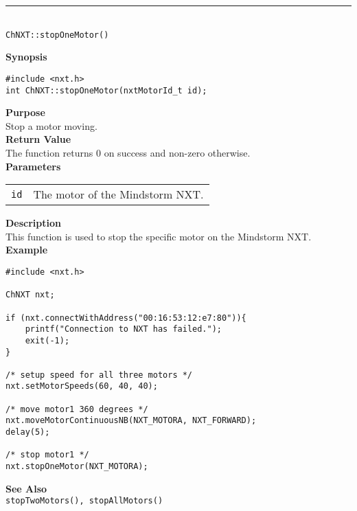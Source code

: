 \noindent
\vspace{5pt}
\rule{4.5in}{0.015in}\\
\noindent
{\LARGE \texttt{ChNXT::stopOneMotor()} }\\


\noindent
{\bf Synopsis}
\begin{lstlisting}
#include <nxt.h>
int ChNXT::stopOneMotor(nxtMotorId_t id);
\end{lstlisting}

\noindent
{\bf Purpose}\\
Stop a motor moving.\\

\noindent
{\bf Return Value}\\
The function returns 0 on success and non-zero otherwise.\\

\noindent
{\bf Parameters}\\
\vspace{-0.1in}
\begin{description}
\item
\begin{tabular}{ p{20mm}p{135mm} }
\texttt{id}       &The motor of the Mindstorm NXT.\\
\end{tabular}
\end{description}

\noindent
{\bf Description}\\
This function is used to stop the specific motor on the Mindstorm NXT.\\

\noindent
{\bf Example}
\begin{lstlisting}
#include <nxt.h> 

ChNXT nxt;

if (nxt.connectWithAddress("00:16:53:12:e7:80")){
    printf("Connection to NXT has failed.");
    exit(-1);
}
    
/* setup speed for all three motors */
nxt.setMotorSpeeds(60, 40, 40);

/* move motor1 360 degrees */
nxt.moveMotorContinuousNB(NXT_MOTORA, NXT_FORWARD);
delay(5);

/* stop motor1 */
nxt.stopOneMotor(NXT_MOTORA);
\end{lstlisting}

\noindent
{\bf See Also}\\
\texttt{stopTwoMotors(), stopAllMotors()}\\
